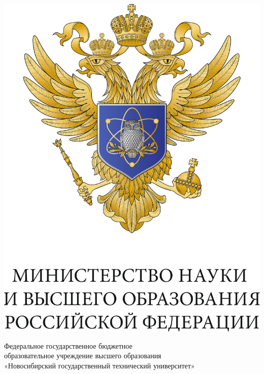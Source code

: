 \documentclass[12pt,a4paper]{article}
\begin{document}
\thispagestyle{empty}
\BgThispage

\begin{center}

\includegraphics[scale=0.5]{pic/eagle}

\vspace{8mm}
\begin{large}
    \begin{spacing}{1}
        Федеральное государственное бюджетное \\
        образовательное учреждение высшего образования \\
        «Новосибирский государственный технический университет»
    \end{spacing}
\vspace{20mm}



\end{large}
\end{center}
\end{document}

